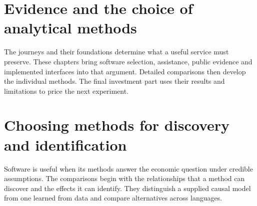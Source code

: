 \documentclass[11pt,a4paper,openany]{book}
\begin{document}







\part{Evidence and the choice of analytical methods}
\label{rewrite:part-synthesis}
The journeys and their foundations determine what a useful service must
preserve. These chapters bring software selection, assistance, public
evidence and implemented interfaces into that argument. Detailed comparisons
then develop the individual methods. The final investment part uses their
results and limitations to price the next experiment.








\part{Choosing methods for discovery and identification}
\label{reading:part-methods}
Software is useful when its methods answer the economic question under
credible assumptions. The comparisons begin with the relationships that a
method can discover and the effects it can identify. They distinguish a supplied
causal model from one learned from data and compare alternatives across languages.











\end{document}

